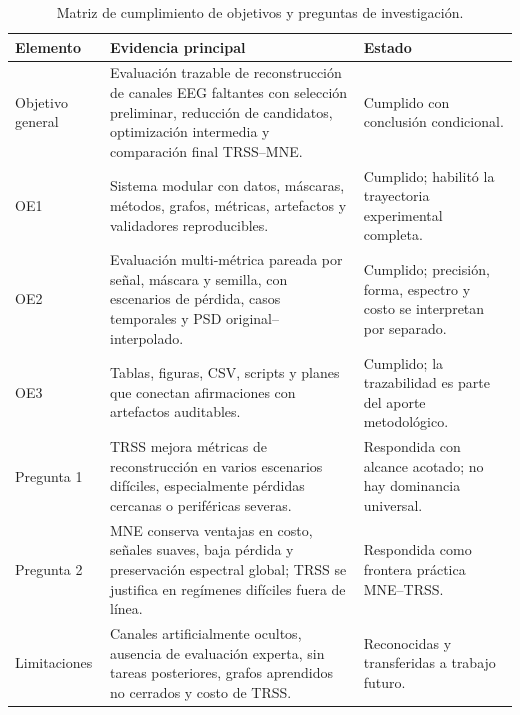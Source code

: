 \begin{table}[htbp]
\centering
\small
\caption{Matriz de cumplimiento de objetivos y preguntas de investigación.}
\label{tab:ch8_objective_evidence}
\begin{tabular}{@{}p{2.35cm}p{5.55cm}p{3.6cm}@{}}
\toprule
Elemento & Evidencia principal & Estado \\
\midrule
Objetivo general & Evaluación trazable de reconstrucción de canales EEG faltantes con selección preliminar, reducción de candidatos, optimización intermedia y comparación final TRSS--MNE. & Cumplido con conclusión condicional. \\
OE1 & Sistema modular con datos, máscaras, métodos, grafos, métricas, artefactos y validadores reproducibles. & Cumplido; habilitó la trayectoria experimental completa. \\
OE2 & Evaluación multi-métrica pareada por señal, máscara y semilla, con escenarios de pérdida, casos temporales y PSD original--interpolado. & Cumplido; precisión, forma, espectro y costo se interpretan por separado. \\
OE3 & Tablas, figuras, CSV, scripts y planes que conectan afirmaciones con artefactos auditables. & Cumplido; la trazabilidad es parte del aporte metodológico. \\
Pregunta 1 & TRSS mejora métricas de reconstrucción en varios escenarios difíciles, especialmente pérdidas cercanas o periféricas severas. & Respondida con alcance acotado; no hay dominancia universal. \\
Pregunta 2 & MNE conserva ventajas en costo, señales suaves, baja pérdida y preservación espectral global; TRSS se justifica en regímenes difíciles fuera de línea. & Respondida como frontera práctica MNE--TRSS. \\
Limitaciones & Canales artificialmente ocultos, ausencia de evaluación experta, sin tareas posteriores, grafos aprendidos no cerrados y costo de TRSS. & Reconocidas y transferidas a trabajo futuro. \\
\bottomrule
\end{tabular}
\end{table}
